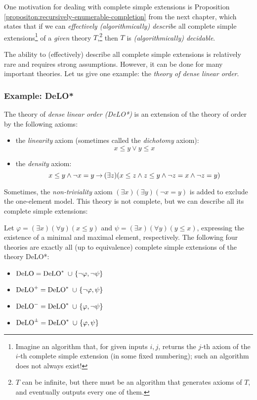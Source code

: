 \begin{remark}
    One motivation for dealing with complete simple extensions is Proposition \ref{propositon:recursively-enumerable-completion} from the next chapter, which states that if we can \emph{effectively (algorithmically) describe} all complete simple extensions\footnote{Imagine an algorithm that, for given inputs $i,j$, returns the $j$-th axiom of the $i$-th complete simple extension (in some fixed numbering); such an algorithm does not always exist!} of a \emph{given} theory $T$,\footnote{$T$ can be infinite, but there must be an algorithm that generates axioms of $T$, and eventually outputs every one of them.} then $T$ is \emph{(algorithmically) decidable}.
\end{remark}

The ability to (effectively) describe all complete simple extensions is relatively rare and requires strong assumptions. However, it can be done for many important theories. Let us give one example: the \emph{theory of dense linear order}.

\subsubsection{Example: DeLO*}

The theory of \emph{dense linear order (DeLO*)} is an extension of the theory of order by the following axioms:
\begin{itemize}
    \item the \emph{linearity} axiom (sometimes called the \emph{dichotomy} axiom):
    $$
    x \leq y \lor y \leq x
    $$
    \item the \emph{density} axiom:
    $$
    {x \leq y} \land {\neg x = y} \mathbin{\rightarrow} (\exists z)(x \leq z \land z \leq y \land \neg z = x \land \neg z = y)
    $$
\end{itemize}
Sometimes, the \emph{non-triviality} axiom $(\exists x)(\exists y)(\neg x = y)$ is added to exclude the one-element model. This theory is not complete, but we can describe all its complete simple extensions:

\begin{proposition}
Let $\varphi = (\exists x)(\forall y)(x \leq y)$ and $\psi = (\exists x)(\forall y)(y \leq x)$, expressing the existence of a minimal and maximal element, respectively. The following four theories are exactly all (up to equivalence) complete simple extensions of the theory DeLO*:
\begin{itemize}
    \item $\DeLO = \DeLO^* \ \cup \ \{\neg\varphi, \neg\psi\}$
    \item $\DeLO^+ = \DeLO^* \ \cup \ \{\neg\varphi, \psi\}$
    \item $\operatorname{DeLO}^- = \operatorname{DeLO}^* \ \cup \ \{\varphi, \neg\psi\}$
    \item $\DeLO^\pm = \DeLO^* \ \cup \ \{\varphi, \psi\}$        
\end{itemize}
\end{proposition}

